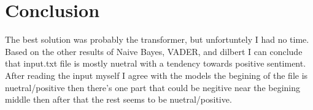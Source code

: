 \documentclass[12pt]{article}
\begin{document}
\section{Conclusion}
The best solution was probably the transformer, but unfortuntely I had no time. Based on the other results of Naive Bayes, VADER, and dilbert I can conclude that input.txt file is mostly nuetral with a tendency towards positive sentiment. After reading the input myself I agree with the models the begining of the file is nuetral/positive then there's one part that could be negitive near the begining middle then after that the rest seems to be nuetral/positive.

\newpage
{}

\end{document}
